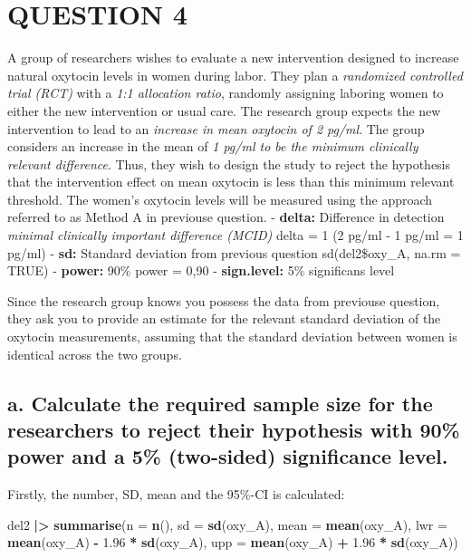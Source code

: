 \documentclass[
]{article}
\newenvironment{Shaded}{\begin{snugshade}}{\end{snugshade}}
\newcommand{\AttributeTok}[1]{\textcolor[rgb]{0.13,0.29,0.53}{#1}}
\newcommand{\FloatTok}[1]{\textcolor[rgb]{0.00,0.00,0.81}{#1}}
\newcommand{\FunctionTok}[1]{\textcolor[rgb]{0.13,0.29,0.53}{\textbf{#1}}}
\newcommand{\NormalTok}[1]{#1}
\newcommand{\SpecialCharTok}[1]{\textcolor[rgb]{0.81,0.36,0.00}{\textbf{#1}}}
\begin{document}
\section{QUESTION 4}\label{question-4}

A group of researchers wishes to evaluate a new intervention designed to
increase natural oxytocin levels in women during labor. They plan a
\emph{randomized controlled trial (RCT)} with a \emph{1:1 allocation
ratio}, randomly assigning laboring women to either the new intervention
or usual care. The research group expects the new intervention to lead
to an \emph{increase in mean oxytocin of 2 pg/ml}. The group considers
an increase in the mean of \emph{1 pg/ml to be the minimum clinically
relevant difference}. Thus, they wish to design the study to reject the
hypothesis that the intervention effect on mean oxytocin is less than
this minimum relevant threshold. The women's oxytocin levels will be
measured using the approach referred to as Method A in previouse
question. - \textbf{delta:} Difference in detection \emph{minimal
clinically important difference (MCID)} delta = 1 (2 pg/ml - 1 pg/ml = 1
pg/ml) - \textbf{sd:} Standard deviation from previous question
sd(del2\$oxy\_A, na.rm = TRUE) - \textbf{power:} 90\% power = 0,90 -
\textbf{sign.level:} 5\% significans level

Since the research group knows you possess the data from previouse
question, they ask you to provide an estimate for the relevant standard
deviation of the oxytocin measurements, assuming that the standard
deviation between women is identical across the two groups.

\subsection{a. Calculate the required sample size for the researchers to
reject their hypothesis with 90\% power and a 5\% (two-sided)
significance
level.}\label{a.-calculate-the-required-sample-size-for-the-researchers-to-reject-their-hypothesis-with-90-power-and-a-5-two-sided-significance-level.}

Firstly, the number, SD, mean and the 95\%-CI is calculated:

\begin{Shaded}
\begin{Highlighting}[]
\NormalTok{del2 }\SpecialCharTok{|\textgreater{}}
  \FunctionTok{summarise}\NormalTok{(}\AttributeTok{n =} \FunctionTok{n}\NormalTok{(),}
            \AttributeTok{sd =} \FunctionTok{sd}\NormalTok{(oxy\_A),}
            \AttributeTok{mean =} \FunctionTok{mean}\NormalTok{(oxy\_A),}
            \AttributeTok{lwr =} \FunctionTok{mean}\NormalTok{(oxy\_A) }\SpecialCharTok{{-}} \FloatTok{1.96} \SpecialCharTok{*} \FunctionTok{sd}\NormalTok{(oxy\_A),}
            \AttributeTok{upp =} \FunctionTok{mean}\NormalTok{(oxy\_A) }\SpecialCharTok{+} \FloatTok{1.96} \SpecialCharTok{*} \FunctionTok{sd}\NormalTok{(oxy\_A))}
\end{Highlighting}
\end{Shaded}
\end{document}
